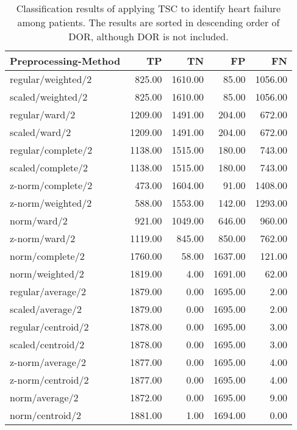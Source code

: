 \begin{longtable}{lrrrr}
    \caption{Classification results of applying TSC to identify heart failure among patients.
             The results are sorted in descending order of DOR, although DOR is not included.}
    \label{tab:tsc_segm_ind_raw_results}\\
    \hline
    Preprocessing-Method &     TP &    TN &    FP &    FN \\
    \hline
    regular/weighted/2   &  825.00 & 1610.00 &   85.00 & 1056.00 \\
    scaled/weighted/2    &  825.00 & 1610.00 &   85.00 & 1056.00 \\
    regular/ward/2       & 1209.00 & 1491.00 &  204.00 &  672.00 \\
    scaled/ward/2        & 1209.00 & 1491.00 &  204.00 &  672.00 \\
    regular/complete/2   & 1138.00 & 1515.00 &  180.00 &  743.00 \\
    scaled/complete/2    & 1138.00 & 1515.00 &  180.00 &  743.00 \\
    z-norm/complete/2    &  473.00 & 1604.00 &   91.00 & 1408.00 \\
    z-norm/weighted/2    &  588.00 & 1553.00 &  142.00 & 1293.00 \\
    norm/ward/2          &  921.00 & 1049.00 &  646.00 &  960.00 \\
    z-norm/ward/2        & 1119.00 &  845.00 &  850.00 &  762.00 \\
    norm/complete/2      & 1760.00 &   58.00 & 1637.00 &  121.00 \\
    norm/weighted/2      & 1819.00 &    4.00 & 1691.00 &   62.00 \\
    regular/average/2    & 1879.00 &    0.00 & 1695.00 &    2.00 \\
    scaled/average/2     & 1879.00 &    0.00 & 1695.00 &    2.00 \\
    regular/centroid/2   & 1878.00 &    0.00 & 1695.00 &    3.00 \\
    scaled/centroid/2    & 1878.00 &    0.00 & 1695.00 &    3.00 \\
    z-norm/average/2     & 1877.00 &    0.00 & 1695.00 &    4.00 \\
    z-norm/centroid/2    & 1877.00 &    0.00 & 1695.00 &    4.00 \\
    norm/average/2       & 1872.00 &    0.00 & 1695.00 &    9.00 \\
    norm/centroid/2      & 1881.00 &    1.00 & 1694.00 &    0.00 \\
    \hline
\end{longtable}
